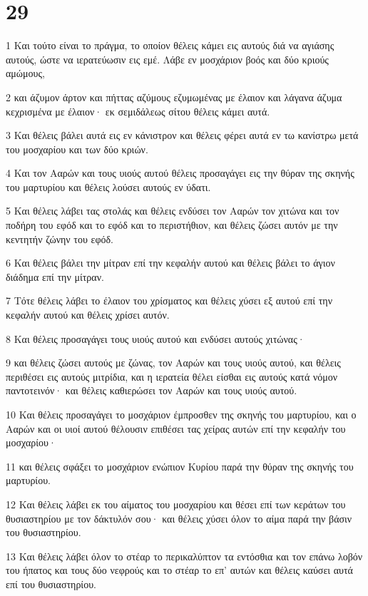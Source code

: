 \chapter{29}

\par 1 Και τούτο είναι το πράγμα, το οποίον θέλεις κάμει εις αυτούς διά να αγιάσης αυτούς, ώστε να ιερατεύωσιν εις εμέ. Λάβε εν μοσχάριον βοός και δύο κριούς αμώμους,
\par 2 και άζυμον άρτον και πήττας αζύμους εζυμωμένας με έλαιον και λάγανα άζυμα κεχρισμένα με έλαιον· εκ σεμιδάλεως σίτου θέλεις κάμει αυτά.
\par 3 Και θέλεις βάλει αυτά εις εν κάνιστρον και θέλεις φέρει αυτά εν τω κανίστρω μετά του μοσχαρίου και των δύο κριών.
\par 4 Και τον Ααρών και τους υιούς αυτού θέλεις προσαγάγει εις την θύραν της σκηνής του μαρτυρίου και θέλεις λούσει αυτούς εν ύδατι.
\par 5 Και θέλεις λάβει τας στολάς και θέλεις ενδύσει τον Ααρών τον χιτώνα και τον ποδήρη του εφόδ και το εφόδ και το περιστήθιον, και θέλεις ζώσει αυτόν με την κεντητήν ζώνην του εφόδ.
\par 6 Και θέλεις βάλει την μίτραν επί την κεφαλήν αυτού και θέλεις βάλει το άγιον διάδημα επί την μίτραν.
\par 7 Τότε θέλεις λάβει το έλαιον του χρίσματος και θέλεις χύσει εξ αυτού επί την κεφαλήν αυτού και θέλεις χρίσει αυτόν.
\par 8 Και θέλεις προσαγάγει τους υιούς αυτού και ενδύσει αυτούς χιτώνας·
\par 9 και θέλεις ζώσει αυτούς με ζώνας, τον Ααρών και τους υιούς αυτού, και θέλεις περιθέσει εις αυτούς μιτρίδια, και η ιερατεία θέλει είσθαι εις αυτούς κατά νόμον παντοτεινόν· και θέλεις καθιερώσει τον Ααρών και τους υιούς αυτού.
\par 10 Και θέλεις προσαγάγει το μοσχάριον έμπροσθεν της σκηνής του μαρτυρίου, και ο Ααρών και οι υιοί αυτού θέλουσιν επιθέσει τας χείρας αυτών επί την κεφαλήν του μοσχαρίου·
\par 11 και θέλεις σφάξει το μοσχάριον ενώπιον Κυρίου παρά την θύραν της σκηνής του μαρτυρίου.
\par 12 Και θέλεις λάβει εκ του αίματος του μοσχαρίου και θέσει επί των κεράτων του θυσιαστηρίου με τον δάκτυλόν σου· και θέλεις χύσει όλον το αίμα παρά την βάσιν του θυσιαστηρίου.
\par 13 Και θέλεις λάβει όλον το στέαρ το περικαλύπτον τα εντόσθια και τον επάνω λοβόν του ήπατος και τους δύο νεφρούς και το στέαρ το επ' αυτών και θέλεις καύσει αυτά επί του θυσιαστηρίου.
